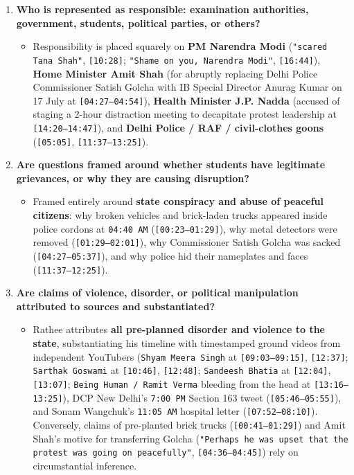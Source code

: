 \documentclass[10pt,a4paper]{article}
\begin{document}
\begin{enumerate}[leftmargin=1.6em, itemsep=4pt, topsep=4pt]
\begin{itemize}[leftmargin=1.4em, itemsep=2pt, topsep=2pt]
  \end{itemize}
  \item \textbf{Who is represented as responsible: examination authorities, government, students, political parties, or others?}
  \begin{itemize}[leftmargin=1.4em, itemsep=2pt, topsep=2pt]
    \item Responsibility is placed squarely on \textbf{PM Narendra Modi} (\texttt{"scared Tana Shah"}, \texttt{[10:28]}; \texttt{"Shame on you, Narendra Modi"}, \texttt{[16:44]}), \textbf{Home Minister Amit Shah} (for abruptly replacing Delhi Police Commissioner Satish Golcha with IB Special Director Anurag Kumar on 17 July at \texttt{[04:27--04:54]}), \textbf{Health Minister J.P. Nadda} (accused of staging a 2-hour distraction meeting to decapitate protest leadership at \texttt{[14:20--14:47]}), and \textbf{Delhi Police / RAF / civil-clothes goons} (\texttt{[05:05]}, \texttt{[11:37--13:25]}).
  \end{itemize}
  \item \textbf{Are questions framed around whether students have legitimate grievances, or why they are causing disruption?}
  \begin{itemize}[leftmargin=1.4em, itemsep=2pt, topsep=2pt]
    \item Framed entirely around \textbf{state conspiracy and abuse of peaceful citizens}: why broken vehicles and brick-laden trucks appeared inside police cordons at \texttt{04:40 AM} (\texttt{[00:23--01:29]}), why metal detectors were removed (\texttt{[01:29--02:01]}), why Commissioner Satish Golcha was sacked (\texttt{[04:27--05:37]}), and why police hid their nameplates and faces (\texttt{[11:37--12:25]}).
  \end{itemize}
  \item \textbf{Are claims of violence, disorder, or political manipulation attributed to sources and substantiated?}
  \begin{itemize}[leftmargin=1.4em, itemsep=2pt, topsep=2pt]
    \item Rathee attributes \textbf{all pre-planned disorder and violence to the state}, substantiating his timeline with timestamped ground videos from independent YouTubers (\texttt{Shyam Meera Singh} at \texttt{[09:03--09:15]}, \texttt{[12:37]}; \texttt{Sarthak Goswami} at \texttt{[10:46]}, \texttt{[12:48]}; \texttt{Sandeesh Bhatia} at \texttt{[12:04]}, \texttt{[13:07]}; \texttt{Being Human / Ramit Verma} bleeding from the head at \texttt{[13:16--13:25]}), DCP New Delhi's \texttt{7:00 PM} Section 163 tweet (\texttt{[05:46--05:55]}), and Sonam Wangchuk's \texttt{11:05 AM} hospital letter (\texttt{[07:52--08:10]}). Conversely, claims of pre-planted brick trucks (\texttt{[00:41--01:29]}) and Amit Shah's motive for transferring Golcha (\texttt{"Perhaps he was upset that the protest was going on peacefully"}, \texttt{[04:36--04:45]}) rely on circumstantial inference.

\end{itemize}
\end{enumerate}
\end{document}
